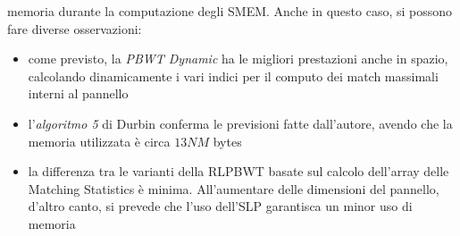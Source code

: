 memoria durante la computazione degli SMEM. Anche in questo caso, si possono fare
diverse osservazioni:
\begin{itemize}
  \item come previsto, la \textit{PBWT Dynamic} ha le migliori prestazioni anche
  in spazio, calcolando dinamicamente i vari indici per il computo dei match
  massimali interni al pannello
  \item l'\textit{algoritmo 5} di Durbin conferma le previsioni fatte
  dall'autore, avendo che la memoria utilizzata è circa $13NM$ bytes
  \item la differenza tra le varianti della RLPBWT basate sul calcolo dell'array
  delle Matching Statistics è minima. All'aumentare delle dimensioni del
  pannello, d'altro canto, si prevede che l'uso dell'SLP garantisca un minor uso
  di memoria
\end{itemize}
